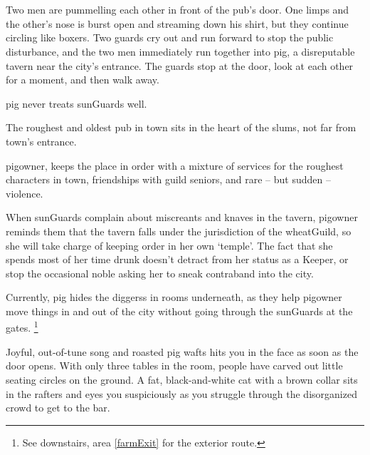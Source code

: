 \section{}

\begin{multicols}{2}

\begin{boxtext}
  Two men are pummelling each other in front of the pub's door.
   One limps and the other's nose is burst open and streaming down his shirt, but they continue circling like boxers.
   Two guards cry out and run forward to stop the public disturbance, and the two men immediately run together into \gls{pig}, a disreputable tavern near the city's entrance.
   The guards stop at the door, look at each other for a moment, and then walk away.

\Gls{pig} never treats \glspl{sunGuard} well.
\end{boxtext}
 
The roughest and oldest pub in \gls{town} sits in the heart of the slums, not far from \gls{town}'s entrance.

\Gls{pigowner}, keeps the place in order with a mixture of services for the roughest characters in \gls{town}, friendships with guild seniors, and rare -- but sudden -- violence.

When \glspl{sunGuard} complain about miscreants and knaves in the tavern, \gls{pigowner} reminds them that the tavern falls under the jurisdiction of the \gls{wheatGuild}, so she will take charge of keeping order in her own `temple'.
The fact that she spends most of her time drunk doesn't detract from her status as a Keeper, or stop the occasional noble asking her to sneak contraband into the city.

Currently, \gls{pig} hides the \glspl{diggers} in rooms underneath, as they help \gls{pigowner} move things in and out of the city without going through the \glspl{sunGuard} at the gates.%
\footnote{See downstairs, area \vref{farmExit} for the exterior route.}

\begin{boxtext}
  Joyful, out-of-tune song and roasted pig wafts hits you in the face as soon as the door opens.
  With only three tables in the room, people have carved out little seating circles on the ground.
  A fat, black-and-white cat with a brown collar sits in the rafters and eyes you suspiciously as you struggle through the disorganized crowd to get to the bar.
\end{boxtext}
\label{pigCat}


\end{multicols}
